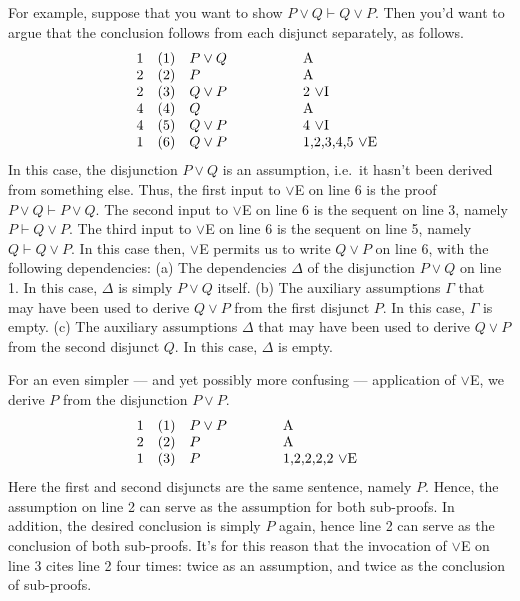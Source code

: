 For example, suppose that you want to show $P\vee Q\vdash Q\vee P$.
Then you'd want to argue that the conclusion follows from each
disjunct separately, as follows.
\[ \begin{array}{l l >{$}p{2.5cm}<{$} p{2cm}}
    1 & (1) & P\vee Q & A \\
    2 & (2) & P       & A \\
    2 & (3) & Q\vee P & 2 $\vee$I \\
    4 & (4) & Q       & A \\
    4 & (5) & Q\vee P & 4 $\vee$I \\
    1 & (6) & Q\vee P & 1,2,3,4,5
    $\vee$E \end{array} \] In this case, the disjunction $P\vee Q$ is
an assumption, i.e.\ it hasn't been derived from something else.
Thus, the first input to $\vee$E on line 6 is the proof
$P\vee Q\vdash P\vee Q$.  The second input to $\vee$E on line 6 is the
sequent on line 3, namely $P\vdash Q\vee P$.  The third input to
$\vee$E on line 6 is the sequent on line 5, namely $Q\vdash Q\vee P$.
In this case then, $\vee$E permits us to write $Q\vee P$ on line 6,
with the following dependencies: (a) The dependencies $\Delta$ of the
disjunction $P\vee Q$ on line 1.  In this case, $\Delta$ is simply
$P\vee Q$ itself.  (b) The auxiliary assumptions $\Gamma$ that may
have been used to derive $Q\vee P$ from the first disjunct $P$.  In
this case, $\Gamma$ is empty.  (c) The auxiliary assumptions $\Delta$
that may have been used to derive $Q\vee P$ from the second disjunct
$Q$.  In this case, $\Delta$ is empty.

For an even simpler --- and yet possibly more confusing ---
application of $\vee$E, we derive $P$ from the disjunction $P\vee P$.
\[ \begin{array}{l l >{$}p{2cm}<{$} p{2.5cm}}
    1 & (1) & P\vee P & A \\
    2 & (2) & P       & A \\
    1 & (3) & P & 1,2,2,2,2
    $\vee$E \end{array} \] Here the first and second disjuncts are the
same sentence, namely $P$.  Hence, the assumption on line 2 can serve
as the assumption for both sub-proofs.  In addition, the desired
conclusion is simply $P$ again, hence line 2 can serve as the
conclusion of both sub-proofs.  It's for this reason that the
invocation of $\vee$E on line 3 cites line 2 four times: twice as an
assumption, and twice as the conclusion of sub-proofs.

